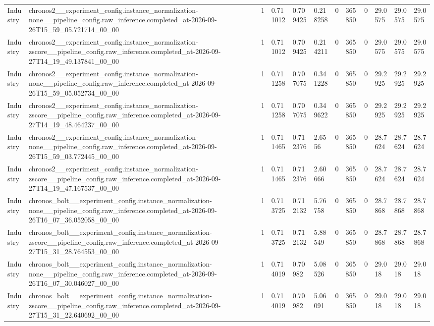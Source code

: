 \begin{tabular}{llllllllllll}
Industry & chronos2\_\_experiment\_config.instance\_normalization-none\_\_pipeline\_config.raw\_inference.completed\_at-2026-09-26T15\_59\_05.721714\_00\_00 & 1 & 0.711012 & 0.709425 & 0.218258 & 0 & 365850 & 0 & 29.0575 & 29.0575 & 29.0575 \\
Industry & chronos2\_\_experiment\_config.instance\_normalization-zscore\_\_pipeline\_config.raw\_inference.completed\_at-2026-09-27T14\_19\_49.137841\_00\_00 & 1 & 0.711012 & 0.709425 & 0.214211 & 0 & 365850 & 0 & 29.0575 & 29.0575 & 29.0575 \\
Industry & chronos2\_\_experiment\_config.instance\_normalization-none\_\_pipeline\_config.raw\_inference.completed\_at-2026-09-26T15\_59\_05.052734\_00\_00 & 1 & 0.711258 & 0.707075 & 0.341228 & 0 & 365850 & 0 & 29.2925 & 29.2925 & 29.2925 \\
Industry & chronos2\_\_experiment\_config.instance\_normalization-zscore\_\_pipeline\_config.raw\_inference.completed\_at-2026-09-27T14\_19\_48.464237\_00\_00 & 1 & 0.711258 & 0.707075 & 0.349622 & 0 & 365850 & 0 & 29.2925 & 29.2925 & 29.2925 \\
Industry & chronos2\_\_experiment\_config.instance\_normalization-none\_\_pipeline\_config.raw\_inference.completed\_at-2026-09-26T15\_59\_03.772445\_00\_00 & 1 & 0.711465 & 0.712376 & 2.6556 & 0 & 365850 & 0 & 28.7624 & 28.7624 & 28.7624 \\
Industry & chronos2\_\_experiment\_config.instance\_normalization-zscore\_\_pipeline\_config.raw\_inference.completed\_at-2026-09-27T14\_19\_47.167537\_00\_00 & 1 & 0.711465 & 0.712376 & 2.60666 & 0 & 365850 & 0 & 28.7624 & 28.7624 & 28.7624 \\
Industry & chronos\_bolt\_\_experiment\_config.instance\_normalization-none\_\_pipeline\_config.raw\_inference.completed\_at-2026-09-26T16\_07\_36.052058\_00\_00 & 1 & 0.713725 & 0.712132 & 5.76758 & 0 & 365850 & 0 & 28.7868 & 28.7868 & 28.7868 \\
Industry & chronos\_bolt\_\_experiment\_config.instance\_normalization-zscore\_\_pipeline\_config.raw\_inference.completed\_at-2026-09-27T15\_31\_28.764553\_00\_00 & 1 & 0.713725 & 0.712132 & 5.88549 & 0 & 365850 & 0 & 28.7868 & 28.7868 & 28.7868 \\
Industry & chronos\_bolt\_\_experiment\_config.instance\_normalization-none\_\_pipeline\_config.raw\_inference.completed\_at-2026-09-26T16\_07\_30.046027\_00\_00 & 1 & 0.714019 & 0.70982 & 5.08526 & 0 & 365850 & 0 & 29.018 & 29.018 & 29.018 \\
Industry & chronos\_bolt\_\_experiment\_config.instance\_normalization-zscore\_\_pipeline\_config.raw\_inference.completed\_at-2026-09-27T15\_31\_22.640692\_00\_00 & 1 & 0.714019 & 0.70982 & 5.06091 & 0 & 365850 & 0 & 29.018 & 29.018 & 29.018 \\

\end{tabular}

